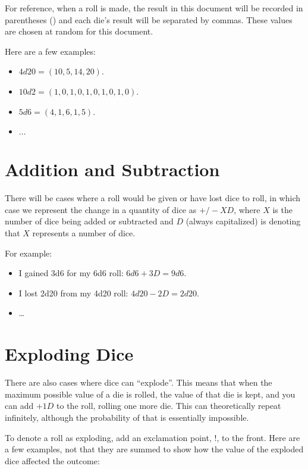\documentclass[../main.tex]{subfiles}
\begin{document}
    For reference, when a roll is made, the result in this document will be recorded in parentheses () and each die's result will be separated by commas. These values are chosen at random for this document.

    Here are a few examples:

    \begin{itemize}
        \item $4d20 = (10, 5, 14, 20)$.
        \item $10d2 = (1, 0, 1, 0, 1, 0, 1, 0, 1, 0)$.
        \item $5d6 = (4, 1, 6, 1, 5)$.
        \item $\dots$
    \end{itemize}

    \section{Addition and Subtraction}

    There will be cases where a roll would be given or have lost dice to roll, in which case we represent the change in a quantity of dice as $+/-XD$, where $X$ is the number of dice being added or subtracted and $D$ (always capitalized) is denoting that $X$ represents a number of dice.

    For example:
    \begin{itemize}
        \item I gained 3d6 for my 6d6 roll: $6d6 + 3D = 9d6$.
        \item I lost 2d20 from my 4d20 roll: $4d20 - 2D = 2d20$.
        \item \dots
    \end{itemize}

    \section{Exploding Dice}

    There are also cases where dice can ``explode''. This means that when the maximum possible value of a die is rolled, the value of that die is kept, and you can add $+1D$ to the roll, rolling one more die. This can theoretically repeat infinitely, although the probability of that is essentially impossible.

    To denote a roll as exploding, add an exclamation point, $!$, to the front. Here are a few examples, not that they are summed to show how the value of the exploded dice affected the outcome:
\end{document}
